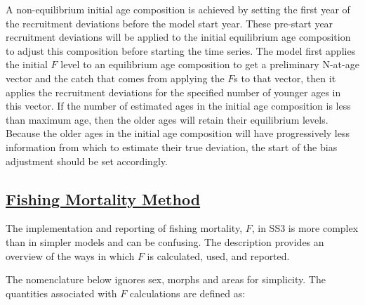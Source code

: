 A non-equilibrium initial age composition is achieved by setting the first year of the recruitment deviations before the model start year. These pre-start year recruitment deviations will be applied to the initial equilibrium age composition to adjust this composition before starting the time series. The model first applies the initial $F$ level to an equilibrium age composition to get a preliminary N-at-age vector and the catch that comes from applying the $F$s to that vector, then it applies the recruitment deviations for the specified number of younger ages in this vector. If the number of estimated ages in the initial age composition is less than maximum age, then the older ages will retain their equilibrium levels. Because the older ages in the initial age composition will have progressively less information from which to estimate their true deviation, the start of the bias adjustment should be set accordingly.

\hypertarget{FMethod}{}
\subsection[Fishing Mortality Method]{\protect\hyperlink{FMethod}{Fishing Mortality Method}}
The implementation and reporting of fishing mortality, $F$, in SS3 is more complex than in simpler models and can be confusing. The description provides an overview of the ways in which $F$ is calculated, used, and reported.


The nomenclature below ignores sex, morphs and areas for simplicity. The quantities associated with $F$ calculations are defined as:


